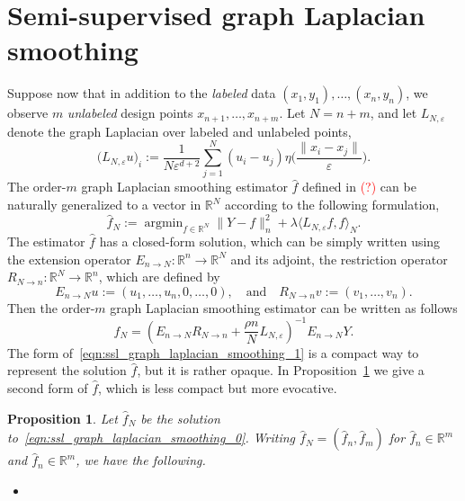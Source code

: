 \documentclass{article}
\newcommand{\Reals}{\mathbb{R}}
\newcommand{\1}{\mathbf{1}}
\DeclareMathOperator*{\argmin}{argmin}
\newcommand{\dotp}[2]{\langle #1, #2 \rangle}
\newcommand{\wh}[1]{\widehat{#1}}
\theoremstyle{alden}
\theoremstyle{aldenthm}
\newtheorem{proposition}{Proposition}
\theoremstyle{definition}
\theoremstyle{remark}
\begin{document}
\section{Semi-supervised graph Laplacian smoothing}

Suppose now that in addition to the \emph{labeled} data $(x_1,y_1),\ldots,(x_n,y_n)$, we observe $m$ \emph{unlabeled} design points $x_{n + 1},\ldots,x_{n + m}$. Let $N = n + m$, and let $L_{N,\varepsilon}$ denote the graph Laplacian over labeled and unlabeled points,
\begin{equation*}
\bigl(L_{N,\varepsilon}u\bigr)_i := \frac{1}{N \varepsilon^{d + 2}}\sum_{j = 1}^{N} (u_i - u_j) \eta\biggl(\frac{\|x_i - x_j\|}{\varepsilon}\biggr).
\end{equation*}
The order-$m$ graph Laplacian smoothing estimator $\wh{f}$ defined in \textcolor{red}{(?)} can be naturally generalized to a vector in $\Reals^N$ according to the following formulation,
\begin{equation}
\label{eqn:ssl_graph_laplacian_smoothing_0}
\wh{f}_N := \argmin_{f \in \Reals^N} \|Y - f\|_n^2 + \lambda \dotp{L_{N,\varepsilon}f}{f}_N.
\end{equation}
The estimator $\wh{f}$ has a closed-form solution, which can be simply written using the extension operator $E_{n \to N}: \Reals^{n} \to \Reals^N$ and its adjoint, the restriction operator $R_{N \to n}: \Reals^{N} \to \Reals^n$, which are defined by
\begin{equation*}
E_{n \to N}u := (u_1,\ldots,u_n,0,\ldots,0),\quad\textrm{and}\quad R_{N \to n}v := (v_1,\ldots,v_n).
\end{equation*}
Then the order-$m$ graph Laplacian smoothing estimator can be written as follows
\begin{equation}
\label{eqn:ssl_graph_laplacian_smoothing_1}
\wh{f}_N = (E_{n \to N} R_{N \to n} + \frac{\rho n}{N} L_{N,\varepsilon})^{-1} E_{n \to N}Y.
\end{equation}
The form of~\eqref{eqn:ssl_graph_laplacian_smoothing_1} is a compact way to represent the solution $\wh{f}$, but it is rather opaque. In Proposition~\ref{prop:ssl_graph_laplacian_smoothing} we give a second form of $\wh{f}$, which is less compact but more evocative. 
\begin{proposition}
	\label{prop:ssl_graph_laplacian_smoothing}
	Let $\wh{f}_N$ be the solution to~\eqref{eqn:ssl_graph_laplacian_smoothing_0}. Writing $\wh{f}_N = (\wh{f}_n,\wh{f}_m)$ for $\wh{f}_n \in \Reals^m$ and $\wh{f}_n \in \Reals^m$, we have the following.
	\begin{itemize}
		\item 
	\end{itemize}
\end{proposition}
\end{document}
